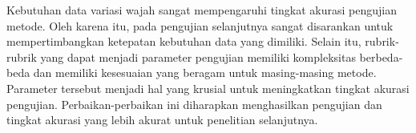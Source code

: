 \documentclass[conference]{IEEEtran}
\begin{document}
Kebutuhan data variasi wajah sangat mempengaruhi tingkat akurasi pengujian metode. Oleh karena itu, pada pengujian selanjutnya sangat disarankan untuk mempertimbangkan ketepatan kebutuhan data yang dimiliki. Selain itu, rubrik-rubrik yang dapat menjadi parameter pengujian memiliki kompleksitas berbeda-beda dan memiliki kesesuaian yang beragam untuk masing-masing metode. Parameter tersebut menjadi hal yang krusial untuk meningkatkan tingkat akurasi pengujian. \cite{Katoch2021} Perbaikan-perbaikan ini diharapkan menghasilkan pengujian dan tingkat akurasi yang lebih akurat untuk penelitian selanjutnya.




\end{document}
